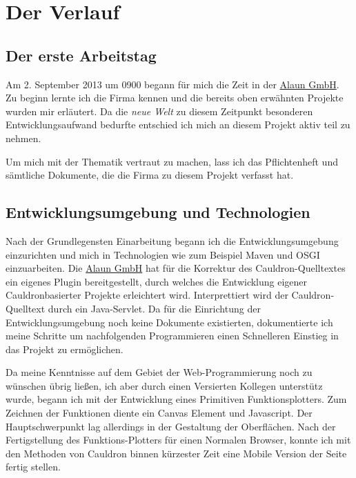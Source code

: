 \documentclass{scrartcl}
\begin{document}
\section{Der Verlauf}

\subsection{Der erste Arbeitstag}

Am 2. September 2013 um 0900 begann für mich die Zeit in der \href{https://alaun.de/home/}{Alaun GmbH}.
Zu beginn lernte ich die Firma kennen und die bereits oben erwähnten Projekte wurden mir erläutert.
Da die \textit{neue Welt} zu diesem Zeitpunkt besonderen Entwicklungsaufwand bedurfte entschied ich mich
an diesem Projekt aktiv teil zu nehmen.

Um mich mit der Thematik vertraut zu machen, lass ich das Pflichtenheft und sämtliche Dokumente, die die Firma
zu diesem Projekt verfasst hat. 

\subsection{Entwicklungsumgebung und Technologien}

Nach der Grundlegensten Einarbeitung begann ich die Entwicklungsumgebung einzurichten und mich in Technologien
wie zum Beispiel Maven und OSGI einzuarbeiten. Die \href{https://alaun.de/home/}{Alaun GmbH} hat für die Korrektur
des Cauldron-Quelltextes ein eigenes Plugin bereitgestellt, durch welches die Entwicklung eigener Cauldronbasierter
Projekte erleichtert wird. Interprettiert wird der Cauldron-Quelltext durch ein Java-Servlet. 
Da für die Einrichtung der Entwicklungsumgebung noch keine Dokumente existierten, dokumentierte ich meine Schritte
um nachfolgenden Programmieren einen Schnelleren Einstieg in das Projekt zu ermöglichen.

Da meine Kenntnisse auf dem Gebiet der Web-Programmierung noch zu wünschen übrig ließen, ich aber durch einen Versierten
Kollegen unterstütz wurde, begann ich mit der Entwicklung eines Primitiven Funktionsplotters. Zum Zeichnen der Funktionen
diente ein Canvas Element und Javascript. Der Hauptschwerpunkt lag allerdings in der Gestaltung der Oberflächen.
Nach der Fertigstellung des Funktions-Plotters für einen Normalen Browser, konnte ich mit den Methoden von Cauldron
binnen kürzester Zeit eine Mobile Version der Seite fertig stellen.





 
\end{document}
